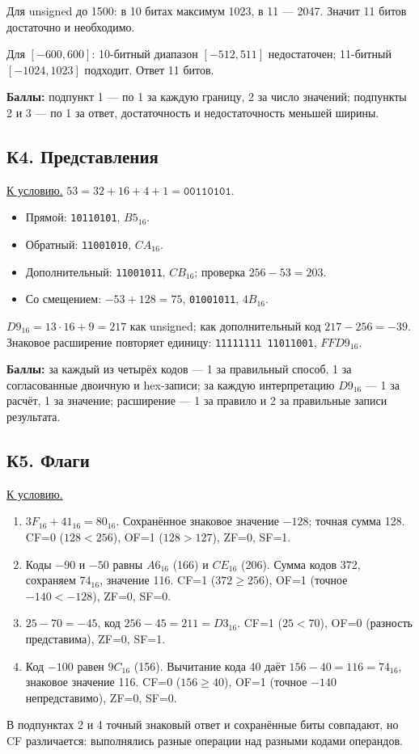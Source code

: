 Для unsigned до 1500: в 10 битах максимум 1023, в 11 --- 2047. Значит 11 битов достаточно и необходимо.

Для $[-600,600]$: 10-битный диапазон $[-512,511]$ недостаточен; 11-битный $[-1024,1023]$ подходит. Ответ 11 битов.

\textbf{Баллы:} подпункт 1 --- по 1 за каждую границу, 2 за число значений; подпункты 2 и 3 --- по 1 за ответ, достаточность и недостаточность меньшей ширины.

\subsection*{К4. Представления}\label{sol:k4}
\hyperref[task:k4]{К условию.}
$53=32+16+4+1=\texttt{00110101}$.
\begin{itemize}
    \item Прямой: \texttt{10110101}, $B5_{16}$.
    \item Обратный: \texttt{11001010}, $CA_{16}$.
    \item Дополнительный: \texttt{11001011}, $CB_{16}$; проверка $256-53=203$.
    \item Со смещением: $-53+128=75$, \texttt{01001011}, $4B_{16}$.
\end{itemize}
$D9_{16}=13\cdot16+9=217$ как unsigned; как дополнительный код $217-256=-39$. Знаковое расширение повторяет единицу: \texttt{11111111 11011001}, $FFD9_{16}$.

\textbf{Баллы:} за каждый из четырёх кодов --- 1 за правильный способ, 1 за согласованные двоичную и hex-записи; за каждую интерпретацию $D9_{16}$ --- 1 за расчёт, 1 за значение; расширение --- 1 за правило и 2 за правильные записи результата.

\subsection*{К5. Флаги}\label{sol:k5}
\hyperref[task:k5]{К условию.}
\begin{enumerate}
    \item $3F_{16}+41_{16}=80_{16}$. Сохранённое знаковое значение $-128$; точная сумма 128. CF=0 ($128<256$), OF=1 ($128>127$), ZF=0, SF=1.
    \item Коды $-90$ и $-50$ равны $A6_{16}$ (166) и $CE_{16}$ (206). Сумма кодов 372, сохраняем $74_{16}$, значение 116. CF=1 ($372\ge256$), OF=1 (точное $-140<-128$), ZF=0, SF=0.
    \item $25-70=-45$, код $256-45=211=D3_{16}$. CF=1 ($25<70$), OF=0 (разность представима), ZF=0, SF=1.
    \item Код $-100$ равен $9C_{16}$ (156). Вычитание кода 40 даёт $156-40=116=74_{16}$, знаковое значение 116. CF=0 ($156\ge40$), OF=1 (точное $-140$ непредставимо), ZF=0, SF=0.
\end{enumerate}
В подпунктах 2 и 4 точный знаковый ответ и сохранённые биты совпадают, но CF различается: выполнялись разные операции над разными кодами операндов.

